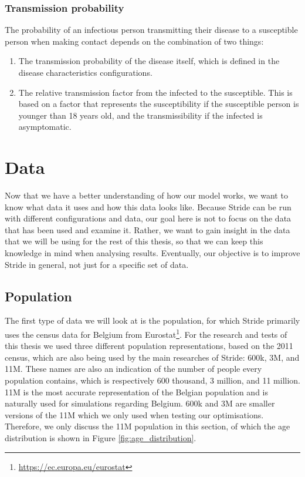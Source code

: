 \subsubsection{Transmission probability}
The probability of an infectious person transmitting their disease to a susceptible person when making contact depends on the combination of two things:
\begin{enumerate}
    \item The transmission probability of the disease itself, which is defined in the disease characteristics configurations.
    \item The relative transmission factor from the infected to the susceptible. This is based on a factor that represents the susceptibility if the susceptible person is younger than 18 years old, and the transmissibility if the infected is asymptomatic.
\end{enumerate}

\section{Data}
\label{sec:data}
Now that we have a better understanding of how our model works, we want to know what data it uses and how this data looks like. Because Stride can be run with different configurations and data, our goal here is not to focus on the data that has been used and examine it. Rather, we want to gain insight in the data that we will be using for the rest of this thesis, so that we can keep this knowledge in mind when analysing results. Eventually, our objective is to improve Stride in general, not just for a specific set of data.

\subsection{Population}
\label{subsec:population_data}
The first type of data we will look at is the population, for which Stride primarily uses the census data for Belgium from Eurostat\footnote{\url{https://ec.europa.eu/eurostat}}. For the research and tests of this thesis we used three different population representations, based on the 2011 census, which are also being used by the main researches of Stride: 600k, 3M, and 11M. These names are also an indication of the number of people every population contains, which is respectively 600 thousand, 3 million, and 11 million. 11M is the most accurate representation of the Belgian population and is naturally used for simulations regarding Belgium. 600k and 3M are smaller versions of the 11M which we only used when testing our optimisations. Therefore, we only discuss the 11M population in this section, of which the age distribution is shown in Figure \ref{fig:age_distribution}.

